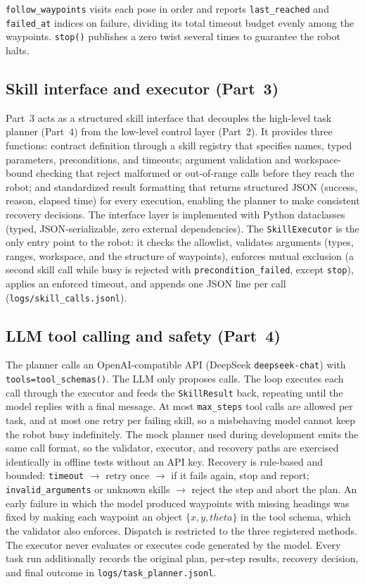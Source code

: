 \documentclass[conference]{IEEEtran}
\begin{document}
\texttt{follow\_waypoints} visits each pose in order and reports
\texttt{last\_reached} and \texttt{failed\_at} indices on failure, dividing
its total timeout budget evenly among the waypoints. \texttt{stop()} publishes
a zero twist several times to guarantee the robot halts.

\subsection{Skill interface and executor (Part~3)}
Part~3 acts as a structured skill interface that decouples the high-level
task planner (Part~4) from the low-level control layer (Part~2). It provides
three functions: contract definition through a skill registry that specifies
names, typed parameters, preconditions, and timeouts; argument validation and
workspace-bound checking that reject malformed or out-of-range calls before
they reach the robot; and standardized result formatting that returns
structured JSON (success, reason, elapsed time) for every execution, enabling
the planner to make consistent recovery decisions. The interface layer is
implemented with Python dataclasses (typed, JSON-serializable, zero external
dependencies). The \texttt{SkillExecutor} is the only entry point to the
robot: it checks the allowlist, validates arguments (types, ranges,
workspace, and the structure of waypoints), enforces mutual exclusion (a
second skill call while busy is rejected with \texttt{precondition\_failed},
except \texttt{stop}), applies an enforced timeout, and appends one JSON line
per call (\texttt{logs/skill\_calls.jsonl}).

\subsection{LLM tool calling and safety (Part~4)}
The planner calls an OpenAI-compatible API (DeepSeek \texttt{deepseek-chat})
with \texttt{tools=tool\_schemas()}. The LLM only proposes calls. The loop
executes each call through the executor and feeds the \texttt{SkillResult}
back, repeating until the model replies with a final message. At most
\texttt{max\_steps} tool calls are allowed per task, and at most one retry per
failing skill, so a misbehaving model cannot keep the robot busy indefinitely.
The mock planner used during development emits the same call
format, so the validator, executor, and recovery paths are exercised
identically in offline tests without an API key. Recovery is rule-based and
bounded: \texttt{timeout} $\rightarrow$ retry once $\rightarrow$ if it fails
again, stop and report; \texttt{invalid\_arguments} or unknown skills
$\rightarrow$ reject the step and abort the plan. An early failure in which
the model produced waypoints with missing headings was fixed by making each
waypoint an object $\{x, y, theta\}$ in the tool schema, which the validator
also enforces. Dispatch is restricted to the three registered methods. The
executor never evaluates or executes code generated by the model. Every task
run additionally records the original plan, per-step results, recovery
decision, and final outcome in \texttt{logs/task\_planner.jsonl}.
\end{document}

